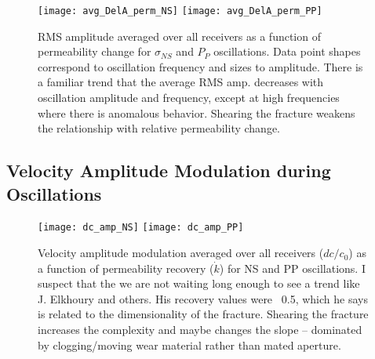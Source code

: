 \clearpage


\begin{figure}[ht]
	\centering
	\texttt{[image: avg\_DelA\_perm\_NS]}
	\texttt{[image: avg\_DelA\_perm\_PP]}
	\caption{RMS amplitude averaged over all receivers as a function of permeability change for $ \sigma_{NS} $ and $ P_P $ oscillations. Data point shapes correspond to oscillation frequency and sizes to amplitude. There is a familiar trend that the average RMS amp. decreases with oscillation amplitude and frequency, except at high frequencies where there is anomalous behavior. Shearing the fracture weakens the relationship with relative permeability change.}
	\label{fig:dela_plots2}
\end{figure}

\clearpage

\subsection{Velocity Amplitude Modulation during Oscillations}
%


\begin{figure}[ht]
	\centering
	\texttt{[image: dc\_amp\_NS]}
	\texttt{[image: dc\_amp\_PP]}
	\caption{Velocity amplitude modulation averaged over all receivers ($ dc/c_0 $) as a function of permeability recovery ($ \dot k $) for NS and PP oscillations. 
		I suspect that the we are not waiting long enough to see a trend like J. Elkhoury and others. His recovery values were ~0.5, which he says is related to the dimensionality of the fracture. Shearing the fracture increases the complexity and maybe changes the slope -- dominated by clogging/moving wear material rather than mated aperture.}
	\label{fig:dc_plots2}
\end{figure}

